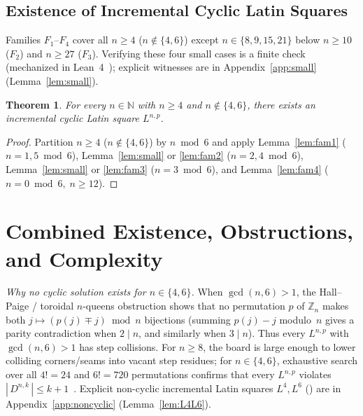 \documentclass[10pt,a4paper]{article}
\newtheorem{theorem}{Theorem}[section]
\theoremstyle{remark}
\begin{document}
\subsection[Existence of Incremental Cyclic Latin Squares]{Existence of Incremental Cyclic Latin Squares}

Families $F_1$--$F_4$ cover all $n \ge 4$ ($n \notin \{4, 6\}$) except $n \in \{8, 9, 15, 21\}$ below
$n \ge 10$ ($F_2$) and $n \ge 27$ ($F_3$). Verifying these four small cases is a finite check
(mechanized in Lean~4~\cite{PalomarLean,CompanionRepo}); explicit witnesses are in
Appendix~\ref{app:small} (Lemma~\ref{lem:small}).

\begin{theorem}\label{thm:main2}
For every $n \in \mathbb{N}$ with $n \ge 4$ and $n \notin \{4, 6\}$, there exists an
\emph{incremental} cyclic Latin square $L^{n,p}$.
\end{theorem}

\begin{proof}
Partition $n \ge 4$ ($n \notin \{4, 6\}$) by $n \bmod 6$ and apply Lemma~\ref{lem:fam1}
($n = 1, 5 \bmod 6$), Lemma~\ref{lem:small} or \ref{lem:fam2} ($n = 2, 4 \bmod 6$),
Lemma~\ref{lem:small} or \ref{lem:fam3} ($n = 3 \bmod 6$), and Lemma~\ref{lem:fam4}
($n = 0 \bmod 6, \; n \ge 12$).
\end{proof}

\section[Combined Existence, Obstructions, and Complexity]{Combined Existence, Obstructions, and Complexity}\label{sec:combined}

\emph{Why no cyclic solution exists for $n \in \{4, 6\}$.}
When $\gcd(n,6) > 1$, the Hall--Paige / toroidal $n$-queens obstruction shows that no permutation $p$
of $\mathbb{Z}_n$ makes both $j \mapsto (p(j) \mp j) \bmod n$ bijections (summing $p(j) - j$ modulo~$n$
gives a parity contradiction when $2 \mid n$, and similarly when $3 \mid n$). Thus every $L^{n,p}$ with
$\gcd(n,6) > 1$ has step collisions. For $n \ge 8$, the board is large enough to lower colliding
corners/seams into vacant step residues; for $n \in \{4, 6\}$, exhaustive search over all $4! = 24$ and
$6! = 720$ permutations confirms that every $L^{n,p}$ violates
$|\,D^{n,k}\,| \le k + 1$~\cite{CompanionRepo}. Explicit non-cyclic incremental Latin squares $L^4, L^6$
(\cite{PalomarLean,CompanionRepo}) are in Appendix~\ref{app:noncyclic} (Lemma~\ref{lem:L4L6}).
\end{document}
